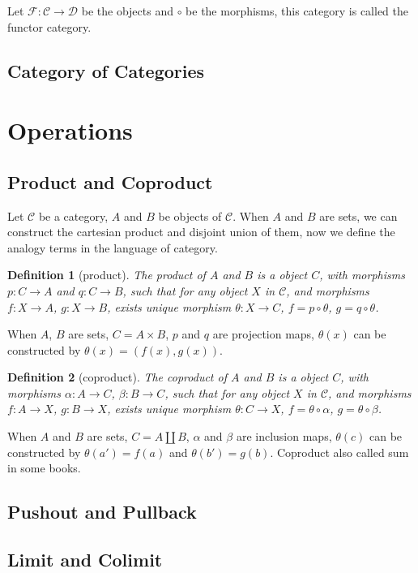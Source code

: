 \documentclass{article}
\newtheorem*{define}{Definition}
\begin{document}
Let $\mathcal F : \mathcal C \to \mathcal D$ be the objects and $\circ$ be the morphisms,
this category is called the functor category.

\subsection{Category of Categories}


\section{Operations}
\subsection{Product and Coproduct}
Let $\mathcal{C}$ be a category, $A$ and $B$ be objects of
$\mathcal{C}$. When $A$ and $B$ are sets, we can construct
the cartesian product and disjoint union of them, now we
define the analogy terms in the language of category.

\begin{define}[product]
The product of $A$ and $B$ is a object $C$, with morphisms
$p: C \to A$ and $q: C \to B$, such that for any object
$X$ in $\mathcal{C}$, and morphisms $f: X \to A$, $g: X \to B$,
exists unique morphism $\theta : X \to C$,
$f = p \circ \theta$, $g = q \circ \theta$.
\end{define}

When $A$, $B$ are sets, $C = A \times B$, $p$ and $q$ are
projection maps, $\theta(x)$ can be constructed by
$\theta(x) = (f(x), g(x))$.

\begin{define}[coproduct]
The coproduct of $A$ and $B$ is a object $C$, with morphisms
$\alpha : A \to C$, $\beta : B \to C$, such that for any
object $X$ in $\mathcal{C}$, and morphisms $f: A \to X$,
$g: B \to X$, exists unique morphism $\theta : C \to X$,
$f = \theta \circ \alpha$, $g = \theta \circ \beta$.
\end{define}

When $A$ and $B$ are sets, $C = A \amalg B$, $\alpha$ and
$\beta$ are inclusion maps, $\theta(c)$ can be constructed
by $\theta(a') = f(a)$ and $\theta(b') = g(b)$.
Coproduct also called sum in some books.

\subsection{Pushout and Pullback}

\subsection{Limit and Colimit}
\end{document}
